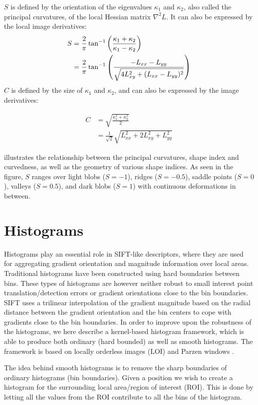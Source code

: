 \documentclass[thesis.tex]{subfiles}
\begin{document}
$S$ is defined by the orientation of the eigenvalues $\kappa_1$ and $\kappa_2$, also called the principal curvatures, of the local Hessian matrix $\nabla^2 L$. It can also be expressed by the local image derivatives:
%
\begin{align}
S &= \frac{2}{\pi} \tan^{-1} \left( \frac{\kappa_1 + \kappa_2}{\kappa_1 - \kappa_2} \right) \\
&= \frac{2}{\pi} \tan^{-1} \left( \frac{-L_{xx} - L_{yy}}{\sqrt{4 L_{xy}^2 + (L_{xx} - L_{yy})^2}} \right)
\end{align}
%
$C$ is defined by the size of $\kappa_1$ and $\kappa_2$, and can also be expressed by the image derivatives:
%
\begin{samepage}
\begin{align}
C &= \sqrt{\frac{\kappa_1^2 + \kappa_2^2}{2}} \\
&= \frac{1}{\sqrt2} \sqrt{L_{xx}^2 + 2 L_{xy}^2 + L_{yy}^2}
\end{align}
\end{samepage}
%
 illustrates the relationship between the principal curvatures, shape index and curvedness, as well as the geometry of various shape indices. As seen in the figure, $S$ ranges over light blobs ($S = -1$), ridges ($S = -0.5$), saddle points ($S = 0$), valleys ($S = 0.5$), and dark blobs ($S = 1$) with continuous deformations in between.
%
\section{Histograms}
\label{sec:histograms}

Histograms play an essential role in SIFT-like descriptors, where they are used for aggregating gradient orientation and magnitude information over local areas. Traditional histograms have been constructed using hard boundaries between bins. These types of histograms are however neither robust to small interest point translation/detection errors or gradient orientations close to the bin boundaries. SIFT uses a trilinear interpolation of the gradient magnitude based on the radial distance between the gradient orientation and the bin centers to cope with gradients close to the bin boundaries. In order to improve upon the robustness of the histograms, we here describe a kernel-based histogram framework, which is able to produce both ordinary (hard bounded) as well as smooth histograms. The framework is based on locally orderless images (LOI) \cite{koenderink1999structure} and Parzen windows \cite{parzen1962estimation}.

The idea behind smooth histograms is to remove the sharp boundaries of ordinary histograms (bin boundaries). Given a position we wish to create a histogram for the surrounding local area/region of interest (ROI). This is done by letting all the values from the ROI contribute to all the bins of the histogram.
\end{document}

